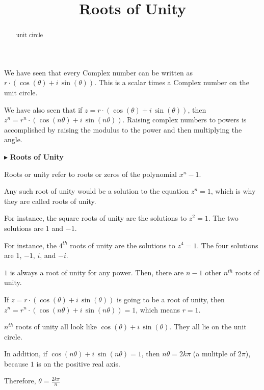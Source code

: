 \documentclass{ximera}
\title{Roots of Unity}
\begin{document}
\begin{abstract}
unit circle
\end{abstract}
\maketitle




We have seen that every Complex number can be written as $r \cdot (\cos(\theta) + i \, \sin(\theta))$.  This is a scalar times a Complex number on the unit circle.

We have also seen that if $z = r \cdot (\cos(\theta) + i \, \sin(\theta))$, then $z^n = r^n \cdot (\cos(n\theta) + i \, \sin(n\theta))$. Raising complex numbers to powers is accomplished by raising the modulus to the power and then multiplying the angle.


$\blacktriangleright$  \textbf{Roots of Unity}

Roots or unity refer to roots or zeros of the polynomial $x^n - 1$.

Any such root of unity would be a solution to the equation $z^n = 1$, which is why they are called roots of unity.




For instance, the square roots of unity are the solutions to $z^2 = 1$.  The two solutions are $1$ and $-1$.


For instance, the $4^{th}$ roots of unity are the solutions to $z^4 = 1$.  The four solutions are $1$, $-1$, $i$, and $-i$.




$1$ is always a root of unity for any power. Then, there are $n-1$ other $n^{th}$ roots of unity.



If $z = r \cdot (\cos(\theta) + i \, \sin(\theta))$ is going to be a root of unity, then $z^n = r^n \cdot (\cos(n\theta) + i \, \sin(n\theta)) = 1$, which means $r=1$.

$n^{th}$ roots of unity all look like $\cos(\theta) + i \, \sin(\theta)$.  They all lie on the unit circle.



In addition, if $\cos(n\theta) + i \, \sin(n\theta) = 1$, then $n \theta = 2 k \pi$ (a mulitple of $2 \pi$), because $1$ is on the positive real axis.


Therefore, $\theta = \frac{2 k \pi}{n}$  
\end{document}
